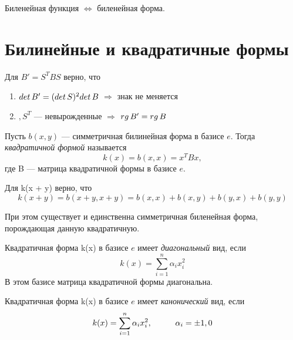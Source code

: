 Биленейная функция $\Longleftrightarrow$ биленейная форма.












\section{Билинейные и квадратичные формы}

Для $B' = S^TBS$ верно, что
\begin{enumerate}
    \item $det\thinspace B' = (det\thinspace S)^2det\thinspace B$ $\Longrightarrow$ знак не меняется
    \item $, S^T$ --- невырожденные $\Longrightarrow$ $rg\thinspace B' = rg\thinspace B$
\end{enumerate}

\begin{definition}
    Пусть $b(x, y)$ --- симметричная билинейная форма в базисе $e$. Тогда \textit{квадратичной формой} называется
    \[
    k(x) = b(x, x) = x^TBx,
    \]
    где B --- матрица квадратичной формы в базисе $e$.
\end{definition}

Для k(x + y) верно, что
\[
k(x + y) = b(x + y, x + y) = b(x, x) + b(x, y) + b(y, x) + b(y, y)
\]

При этом существует и единственна  симметричная биленейная форма, порождающая данную квадратичную.

\begin{definition}
    Квадратичная форма k(x) в базисе $e$ имеет \textit{диагональный} вид, если
    \[
    k(x) = \sum_{i = 1}^n\alpha_ix_i^2
    \]
    В этом базисе матрица квадратичной формы диагональна.
\end{definition}

\begin{definition}
    Квадратичная форма k(x) в базисе $e$ имеет \textit{канонический} вид, если
    \[
    k(x) = \sum_{i = 1}^n\alpha_ix_i^2, \hspace*{1cm} \alpha_i = \pm 1, 0
    \]
\end{definition}

